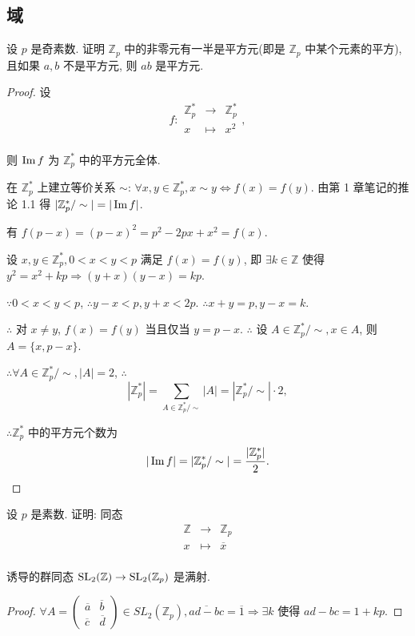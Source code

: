 \documentclass[color=black,device=normal,lang=cn,mode=geye]{elegantnote}
\begin{document}
\subsection{域}
\begin{exercisec}[5.4.6]
    设 $p$ 是奇素数. 证明 $\mathbb{Z}_p$ 中的非零元有一半是平方元(即是 $\mathbb{Z}_p$ 中某个元素的平方), 且如果 $a,b$ 不是平方元, 则 $ab$ 是平方元.
\end{exercisec}
\begin{proof}
    设
    \[f:\begin{array}{rcl}
        \mathbb{Z}_p^* & \to & \mathbb{Z}_p^* \\
        x & \mapsto & x^2 \\
    \end{array},\]

    则 $\operatorname{Im} f$ 为 $\mathbb{Z}_p^*$ 中的平方元全体.

    在 $\mathbb{Z}_p^*$ 上建立等价关系 $\sim$: $\forall x,y\in\mathbb{Z}_p^*,x\sim y\Leftrightarrow f(x)= f(y)$. 由第 1 章笔记的推论 1.1 得 $|\mathbb{Z}_p^*/\sim|=|\operatorname{Im} f|$.

    有 $f(p-x)=(p-x)^2=p^2-2px+x^2=f(x)$.
    
    设 $x,y\in\mathbb{Z}_p^*,0<x<y<p$ 满足 $f(x)=f(y)$, 即 $\exists k\in\mathbb{Z}$ 使得 $y^2=x^2+kp\Rightarrow(y+x)(y-x)=kp$.

    $\because0<x<y<p$, $\therefore y-x<p,y+x<2p$. $\therefore x+y=p,y-x=k$.

    $\therefore$ 对 $x\neq y$, $f(x)=f(y)$ 当且仅当 $y=p-x$. $\therefore$ 设 $A\in\mathbb{Z}_p^*/\sim,x\in A$, 则 $A=\{x,p-x\}$.

    $\therefore\forall A\in\mathbb{Z}_p^*/\sim,|A|=2$, $\therefore$
    \[|\mathbb{Z}_p^*|=\sum\limits_{A\in\mathbb{Z}_p^*/\sim}|A|=|\mathbb{Z}_p^*/\sim|\cdot2,\]

    $\therefore\mathbb{Z}_p^*$ 中的平方元个数为
    \[|\operatorname{Im} f|=|\mathbb{Z}_p^*/\sim|=\dfrac{|\mathbb{Z}_p^*|}{2}.\]
\end{proof}
\begin{exercisec}[5.4.7]
    设 $p$ 是素数. 证明: 同态
    \[\begin{array}{rcl}
        \mathbb{Z} & \to & \mathbb{Z}_p \\
        x & \mapsto & \overline{x} \\
    \end{array}\]

    诱导的群同态 $\operatorname{SL}_2(\mathbb{Z})\to\operatorname{SL}_2(\mathbb{Z}_p)$ 是满射.
\end{exercisec}
\begin{proof}
    $\forall A=\begin{pmatrix} \overline{a} & \overline{b} \\ \overline{c} & \overline{d} \end{pmatrix}\in SL_2(\mathbb{Z}_p),\overline{ad-bc}=\overline{1}\Rightarrow\exists k$ 使得 $ad-bc=1+kp$.
\end{proof}
\end{document}
